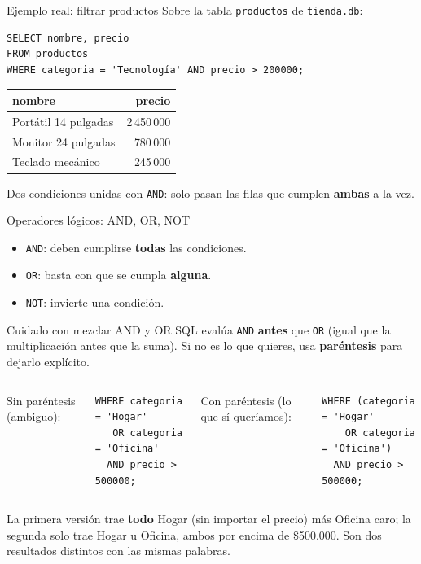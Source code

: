 \documentclass[aspectratio=169,11pt]{beamer}
\begin{document}
\begin{frame}[fragile]{Ejemplo real: filtrar productos}
  \small
  Sobre la tabla \texttt{productos} de \texttt{tienda.db}:
  \begin{lstlisting}
SELECT nombre, precio
FROM productos
WHERE categoria = 'Tecnología' AND precio > 200000;
  \end{lstlisting}
  \begin{center}
    \small
    \begin{tabular}{lr}
      \toprule
      \textbf{nombre} & \textbf{precio} \\
      \midrule
      Portátil 14 pulgadas & 2\,450\,000 \\
      Monitor 24 pulgadas & 780\,000 \\
      Teclado mecánico & 245\,000 \\
      \bottomrule
    \end{tabular}
  \end{center}
  \small Dos condiciones unidas con \texttt{AND}: solo pasan las filas que
  cumplen \textbf{ambas} a la vez.
\end{frame}

\begin{frame}[fragile]{Operadores lógicos: AND, OR, NOT}
  \small
  \begin{itemize}
    \small
    \item \texttt{AND}: deben cumplirse \textbf{todas} las condiciones.
    \item \texttt{OR}: basta con que se cumpla \textbf{alguna}.
    \item \texttt{NOT}: invierte una condición.
  \end{itemize}
  \begin{alertblock}{Cuidado con mezclar AND y OR}
    \small SQL evalúa \texttt{AND} \textbf{antes} que \texttt{OR} (igual
    que la multiplicación antes que la suma). Si no es lo que quieres,
    usa \textbf{paréntesis} para dejarlo explícito.
  \end{alertblock}
  \begin{columns}[T,onlytextwidth]
    \small Sin paréntesis (ambiguo):
    \begin{lstlisting}
WHERE categoria = 'Hogar'
   OR categoria = 'Oficina'
  AND precio > 500000;
    \end{lstlisting}
    \small Con paréntesis (lo que sí queríamos):
    \begin{lstlisting}
WHERE (categoria = 'Hogar'
    OR categoria = 'Oficina')
  AND precio > 500000;
    \end{lstlisting}
  \end{columns}
  \small La primera versión trae \textbf{todo} Hogar (sin importar el
  precio) más Oficina caro; la segunda solo trae Hogar u Oficina, ambos
  por encima de \$500.000. Son dos resultados distintos con las mismas
  palabras.
\end{frame}
\end{document}
